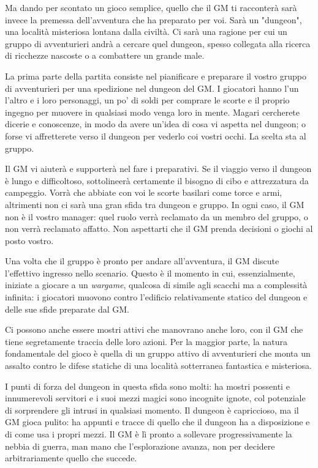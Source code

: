 Ma dando per scontato un gioco semplice, quello che il GM ti racconterà sarà invece la premessa dell'avventura che ha preparato per voi. Sarà un "dungeon", una località misteriosa lontana dalla civiltà. Ci sarà una ragione per cui un gruppo di avventurieri andrà a cercare quel dungeon, spesso collegata alla ricerca di ricchezze nascoste o a combattere un grande male.

La prima parte della partita consiste nel pianificare e preparare il vostro gruppo di avventurieri per una spedizione nel dungeon del GM. I giocatori hanno l'un l'altro e i loro personaggi, un po' di soldi per comprare le scorte e il proprio ingegno per muovere in qualsiasi modo venga loro in mente. Magari cercherete dicerie e conoscenze, in modo da avere un'idea di cosa vi aspetta nel dungeon; o forse vi affretterete verso il dungeon per vederlo coi vostri occhi. La scelta sta al gruppo.

Il GM vi aiuterà e supporterà nel fare i preparativi. Se il viaggio verso il dungeon è lungo e difficoltoso, sottolineerà certamente il bisogno di cibo e attrezzatura da campeggio. Vorrà che abbiate con voi le scorte basilari come torce e armi, altrimenti non ci sarà una gran sfida tra dungeon e gruppo. In ogni caso, il GM non è il vostro manager: quel ruolo verrà reclamato da un membro del gruppo, o non verrà reclamato affatto. Non aspettarti che il GM prenda decisioni o giochi al posto vostro.


Una volta che il gruppo è pronto per andare all'avventura, il GM discute l'effettivo ingresso nello scenario. Questo è il momento in cui, essenzialmente, iniziate a giocare a un \textit{wargame}, qualcosa di simile agli scacchi ma a complessità infinita: i giocatori muovono contro l'edificio relativamente statico del dungeon e delle sue sfide preparate dal GM.

Ci possono anche essere mostri attivi che manovrano anche loro, con il GM che tiene segretamente traccia delle loro azioni. Per la maggior parte, la natura fondamentale del gioco è quella di un gruppo attivo di avventurieri che monta un assalto contro le difese statiche di una località sotterranea fantastica e misteriosa.

I punti di forza del dungeon in questa sfida sono molti: ha mostri possenti e innumerevoli servitori e i suoi mezzi magici sono incognite ignote, col potenziale di sorprendere gli intrusi in qualsiasi momento. Il dungeon è capriccioso, ma il GM gioca pulito: ha appunti e tracce di quello che il dungeon ha a disposizione e di come usa i propri mezzi. Il GM è lì pronto a sollevare progressivamente la nebbia di guerra, man mano che l'esplorazione avanza, non per decidere arbitrariamente quello che succede.

